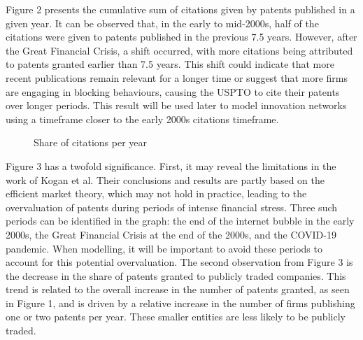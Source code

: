 \documentclass[12pt]{article}
\begin{document}
Figure 2 presents the cumulative sum of citations given by patents published in a given year. It can be observed that, in the early to mid-2000s, half of the citations were given to patents published in the previous 7.5 years. However, after the Great Financial Crisis, a shift occurred, with more citations being attributed to patents granted earlier than 7.5 years. This shift could indicate that more recent publications remain relevant for a longer time or suggest that more firms are engaging in blocking behaviours, causing the USPTO to cite their patents over longer periods. This result will be used later to model innovation networks using a timeframe closer to the early 2000s citations timeframe.

\begin{figure}[h]
\caption{Share of citations per year}
\centering
\end{figure}

Figure 3 has a twofold significance. First, it may reveal the limitations in the work of Kogan et al. Their conclusions and results are partly based on the efficient market theory, which may not hold in practice, leading to the overvaluation of patents during periods of intense financial stress. Three such periods can be identified in the graph: the end of the internet bubble in the early 2000s, the Great Financial Crisis at the end of the 2000s, and the COVID-19 pandemic. When modelling, it will be important to avoid these periods to account for this potential overvaluation.
The second observation from Figure 3 is the decrease in the share of patents granted to publicly traded companies. This trend is related to the overall increase in the number of patents granted, as seen in Figure 1, and is driven by a relative increase in the number of firms publishing one or two patents per year. These smaller entities are less likely to be publicly traded.
\end{document}
